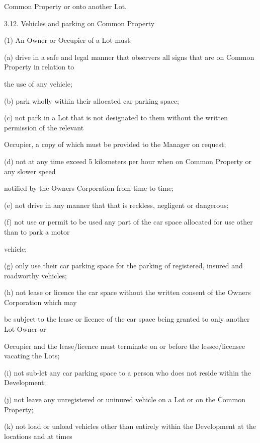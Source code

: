 \documentclass{article}
\begin{document}
{\fontsize{10.02}{1}Common Property or onto another Lot. }

{\fontsize{9.99}{1}3.12. Vehicles and parking on Common Property }

{\fontsize{9.962}{1}(1) An Owner or Occupier of a Lot must: }

{\fontsize{9.962}{1}(a) drive in a safe and legal manner that observers all signs that are on Common Property in relation to }

{\fontsize{10.02}{1}the use of any vehicle; }

{\fontsize{9.962}{1}(b) park wholly within their allocated car parking space; }

{\fontsize{9.962}{1}(c) not park in a Lot that is not designated to them without the written permission of the relevant }

{\fontsize{10.02}{1}Occupier, a copy of which must be provided to the Manager on request; }

{\fontsize{9.962}{1}(d) not at any time exceed 5 kilometers per hour when on Common Property or any slower speed }

{\fontsize{10.02}{1}notified by the Owners Corporation from time to time; }

{\fontsize{9.962}{1}(e) not drive in any manner that that is reckless, negligent or dangerous; }

{\fontsize{9.962}{1}(f) not use or permit to be used any part of the car space allocated for use other than to park a motor }

{\fontsize{10.02}{1}vehicle; }

{\fontsize{9.962}{1}(g) only use their car parking space for the parking of registered, insured and roadworthy vehicles; }

{\fontsize{9.962}{1}(h) not lease or licence the car space without the written consent of the Owners Corporation which may }

{\fontsize{10.02}{1}be subject to the lease or licence of the car space being granted to only another Lot Owner or }

{\fontsize{10.02}{1}Occupier and the lease/licence must terminate on or before the lessee/licensee vacating the Lots; }

{\fontsize{9.962}{1}(i) not sub-let any car parking space to a person who does not reside within the Development; }

{\fontsize{9.962}{1}(j) not leave any unregistered or uninured vehicle on a Lot or on the Common Property; }

{\fontsize{9.962}{1}(k) not load or unload vehicles other than entirely within the Development at the locations and at times }
\end{document}

